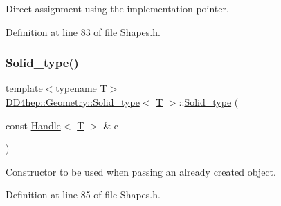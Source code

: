 Direct assignment using the implementation pointer. 



Definition at line 83 of file Shapes.\+h.

\hypertarget{class_d_d4hep_1_1_geometry_1_1_solid__type_a153b1496923f3a094a13bfb57e73a81e}{}\label{class_d_d4hep_1_1_geometry_1_1_solid__type_a153b1496923f3a094a13bfb57e73a81e} 
\subsubsection{\texorpdfstring{Solid\+\_\+type()}{Solid\_type()}\hspace{0.1cm}{\footnotesize\ttfamily [4/5]}}
{\footnotesize\ttfamily template$<$typename T$>$ \\
\hyperlink{class_d_d4hep_1_1_geometry_1_1_solid__type}{D\+D4hep\+::\+Geometry\+::\+Solid\+\_\+type}$<$ \hyperlink{class_t}{T} $>$\+::\hyperlink{class_d_d4hep_1_1_geometry_1_1_solid__type}{Solid\+\_\+type} (\begin{DoxyParamCaption}\item[{const \hyperlink{class_d_d4hep_1_1_handle}{Handle}$<$ \hyperlink{class_t}{T} $>$ \&}]{e }\end{DoxyParamCaption})\hspace{0.3cm}{\ttfamily [inline]}}



Constructor to be used when passing an already created object. 



Definition at line 85 of file Shapes.\+h.

\hypertarget{class_d_d4hep_1_1_geometry_1_1_solid__type_ad3ad0b3e5f7d6120b97daedb0d0a85dc}{}\label{class_d_d4hep_1_1_geometry_1_1_solid__type_ad3ad0b3e5f7d6120b97daedb0d0a85dc} 
